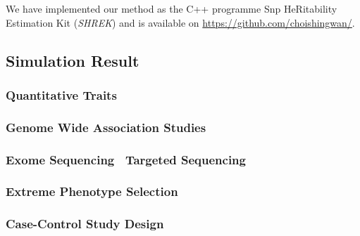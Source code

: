 We have implemented our method as the C++ programme Snp HeRitability Estimation Kit (\textit{SHREK}) and is available on \url{https://github.com/choishingwan/}.
\subsection{Simulation Result}
\subsubsection{Quantitative Traits}
\subsubsection{Genome Wide Association Studies}
\subsubsection{Exome Sequencing \ Targeted Sequencing}
\subsubsection{Extreme Phenotype Selection}
\subsubsection{Case-Control Study Design}